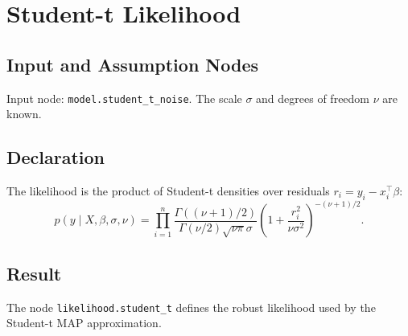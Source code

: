 \section{Student-t Likelihood}
\label{likelihood:student-t}

\subsection{Input and Assumption Nodes}
Input node: \texttt{model.student\_t\_noise}. The scale \(\sigma\) and degrees of freedom \(\nu\) are known.

\subsection{Declaration}
The likelihood is the product of Student-t densities over residuals \(r_i=y_i-x_i^\top\beta\):
\[
  p(y\mid X,\beta,\sigma,\nu)
  =
  \prod_{i=1}^n
  \frac{\Gamma((\nu+1)/2)}{\Gamma(\nu/2)\sqrt{\nu\pi}\sigma}
  \left(1+\frac{r_i^2}{\nu\sigma^2}\right)^{-(\nu+1)/2}.
\]

\subsection{Result}
The node \texttt{likelihood.student\_t} defines the robust likelihood used by the Student-t MAP approximation.

